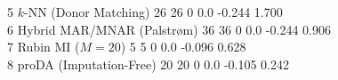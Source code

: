 \documentclass[11pt,oneside]{book}
\begin{document}
\begin{routput}
5 $k$-NN (Donor Matching) \hspace*{4.5em}26 \hspace*{1.5em}26 \hspace*{1em}0 \hspace*{1.8em}0.0 \hspace*{0.8em}-0.244 \hspace*{1.2em}1.700\\
6 Hybrid MAR/MNAR (Palstr{\o}m) \hspace*{1.5em}36 \hspace*{1.5em}36 \hspace*{1em}0 \hspace*{1.8em}0.0 \hspace*{0.8em}-0.244 \hspace*{1.2em}0.906\\
7 Rubin MI ($M = 20$) \hspace*{6.5em}5 \hspace*{2em}5 \hspace*{1em}0 \hspace*{1.8em}0.0 \hspace*{0.8em}-0.096 \hspace*{1.2em}0.628\\
8 proDA (Imputation-Free) \hspace*{3.5em}20 \hspace*{1.5em}20 \hspace*{1em}0 \hspace*{1.8em}0.0 \hspace*{0.8em}-0.105 \hspace*{1.2em}0.242
\end{routput}
\end{document}
